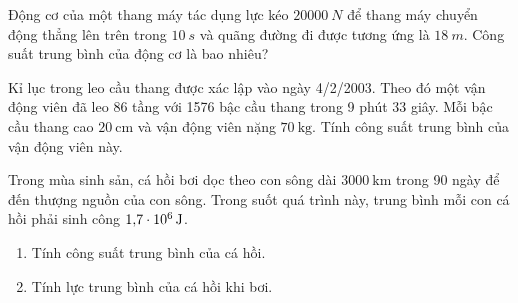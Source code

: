 \begin{ex}
		Động cơ của một thang máy tác dụng lực kéo $\SI{20000}{N}$ để thang máy chuyển động thẳng lên trên trong $\SI{10}{s}$ và quãng đường đi được tương ứng là $\SI{18}{m}$. Công suất trung bình của động cơ là bao nhiêu?
\end{ex}
\begin{ex}
	Kỉ lục trong leo cầu thang được xác lập vào ngày 4/2/2003. Theo đó một vận động viên đã leo 86 tầng với 1576 bậc cầu thang trong 9 phút 33 giây. Mỗi bậc cầu thang cao $\SI{20}{\centi\meter}$ và vận động viên nặng $\SI{70}{\kilogram}$. Tính công suất trung bình của vận động viên này.
\end{ex}
\begin{ex}
	Trong mùa sinh sản, cá hồi bơi dọc theo con sông dài $\SI{3000}{\kilo\meter}$ trong 90 ngày để đến thượng nguồn của con sông. Trong suốt quá trình này, trung bình mỗi con cá hồi phải sinh công $\SI{1.7E6}{\joule}$.
	\begin{enumerate}[label=\alph*)]
		\item Tính công suất trung bình của cá hồi.
		\item Tính lực trung bình của cá hồi khi bơi.
	\end{enumerate}
\end{ex}
